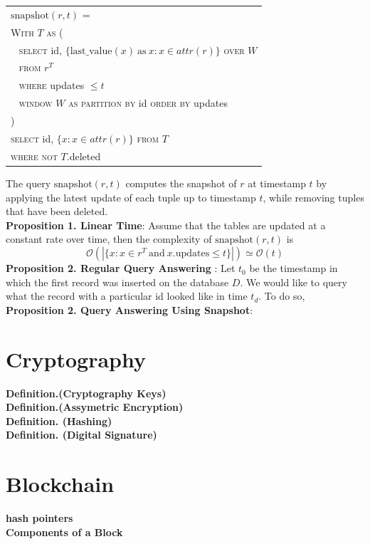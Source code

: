     \vspace{1em}
\begin{center}

{\small
	\begin{tabular}{|l|} \hline
		$\mathrm{snapshot}(r, t)$ = \\
		\verb|| \textsc{With} $T$ \textsc{as} ( \\
		\verb| | \textsc{select} id, $\{\mathrm{last\_value}(x) \mathrm{\ as\ } x:
		x\in attr(r)\}$ \textsc{over} $W$ \\
		\verb| | \textsc{from} $r^T$ \\
		\verb| | \textsc{where} updates $\leq t$ \\
		\verb| | \textsc{window} $W$ \textsc{as} 
		\textsc{partition by} id \textsc{order by} updates\\
		\verb|| ) \\
		\verb|| \textsc{select} id, $\{x: x\in attr(r)\}$ \textsc{from} $T$ \\
		\verb|| \textsc{where not} $T.$deleted \\ \hline
	\end{tabular}
}
\end{center}

The query $\mathrm{snapshot}(r, t)$ computes the snapshot of $r$ at timestamp
$t$ by applying the latest update of each tuple up to timestamp $t$, while
removing tuples that have been deleted.\\
\textbf{Proposition 1. Linear Time}: Assume that the tables are updated at a constant rate over time,
then the complexity of $\mathrm{snapshot}(r, t)$ is 
$$\mathcal{O}(|\{x: x\in r^T\mathrm{\ and\ } x.\mathrm{updates} \leq t\}|)
\simeq \mathcal{O}(t)$$
\textbf{Proposition 2. Regular Query Answering }: Let $t_0$ be the timestamp in which the first record was inserted on the database $D$. We would like to query what the record with a particular id looked like in time $t_d$. To do so, 
\\
\textbf{Proposition 2. Query Answering Using Snapshot}: 
\\
\section{Cryptography}
\textbf{Definition.(Cryptography Keys)}\\
\textbf{Definition.(Assymetric Encryption)}\\
\textbf{Definition. (Hashing)}\\
\textbf{Definition. (Digital Signature)}\\
\section{Blockchain}
\textbf{hash pointers}\\
\textbf{Components of a Block}\\
